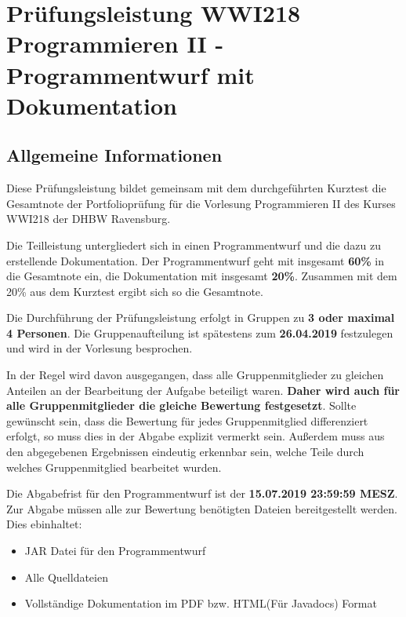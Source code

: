 \documentclass[a4paper,
			   fontsize=12pt]{article}
\begin{document}
\section*{Prüfungsleistung WWI218 Programmieren II - Programmentwurf mit Dokumentation}

\vspace{0,75cm}

\subsection*{Allgemeine Informationen}
Diese Prüfungsleistung bildet gemeinsam mit dem durchgeführten Kurztest die Gesamtnote der Portfolioprüfung für die Vorlesung Programmieren II des Kurses WWI218 der DHBW Ravensburg.

Die Teilleistung untergliedert sich in einen Programmentwurf und die dazu zu erstellende Dokumentation. Der Programmentwurf geht mit insgesamt \textbf{60\%} in die Gesamtnote ein, die Dokumentation mit insgesamt \textbf{20\%}. Zusammen mit dem 20\% aus dem Kurztest ergibt sich so die Gesamtnote.

Die Durchführung der Prüfungsleistung erfolgt in Gruppen zu \textbf{3 oder maximal 4 Personen}. Die Gruppenaufteilung ist spätestens zum \textbf{26.04.2019} festzulegen und wird in der Vorlesung besprochen. 

In der Regel wird davon ausgegangen, dass alle Gruppenmitglieder zu gleichen Anteilen an der Bearbeitung der Aufgabe beteiligt waren. \textbf{Daher wird auch für alle Gruppenmitglieder die gleiche Bewertung festgesetzt}. Sollte gewünscht sein, dass die Bewertung für jedes
Gruppenmitglied differenziert erfolgt, so muss dies in der Abgabe explizit vermerkt sein. Außerdem muss aus den abgegebenen Ergebnissen eindeutig erkennbar sein, welche Teile durch
welches Gruppenmitglied bearbeitet wurden.

Die Abgabefrist für den Programmentwurf ist der \textbf{15.07.2019 23:59:59 MESZ}. Zur Abgabe müssen alle zur Bewertung benötigten Dateien bereitgestellt werden. Dies ebinhaltet:

\begin{itemize}
	\item JAR Datei für den Programmentwurf
	\item Alle Quelldateien
	\item Vollständige Dokumentation im PDF bzw. HTML(Für Javadocs) Format
\end{itemize}
\end{document}

